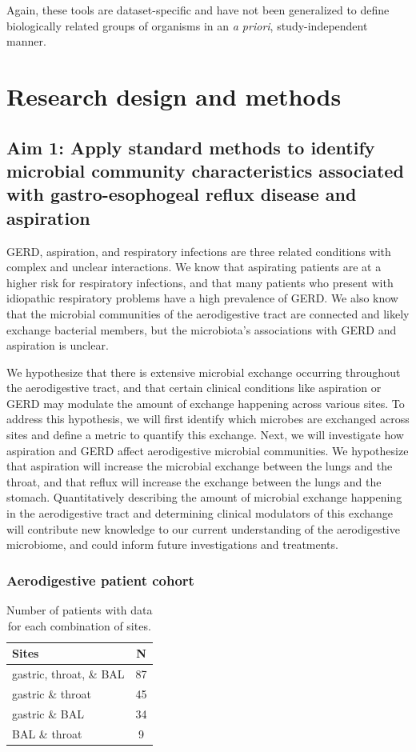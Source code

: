 \documentclass[12pt]{article}
\begin{document}
Again, 
these tools are dataset-specific and have not been generalized to 
define biologically related groups of organisms in an \textit{a priori}, study-independent manner.

\section{Research design and methods}

\subsection{Aim 1: Apply standard methods to identify microbial community characteristics associated with gastro-esophogeal reflux disease and aspiration}

GERD, aspiration, and respiratory infections are three related
conditions with complex and unclear interactions.
We know that aspirating patients are at a higher risk for respiratory
infections, and that many patients who present with idiopathic
respiratory problems have a high prevalence of GERD. 
We also know that the microbial communities of the aerodigestive tract
are connected and likely exchange bacterial members, but the microbiota's
associations with GERD and aspiration is unclear.

We hypothesize that there is extensive microbial exchange occurring
throughout the aerodigestive tract, and that certain clinical conditions like aspiration
or GERD may modulate the amount of exchange happening across various sites. 
To address this hypothesis, we will first identify which microbes
are exchanged across sites and define a metric to quantify this exchange. 
Next, we will investigate how aspiration and GERD affect aerodigestive microbial communities. 
We hypothesize that aspiration will increase the microbial exchange between the lungs and the throat,
and that reflux will increase the exchange between the lungs and the stomach.
Quantitatively describing the amount of microbial exchange happening in the
aerodigestive tract and determining clinical modulators of this exchange
will contribute new knowledge to our current understanding of the
aerodigestive microbiome, and could inform future investigations and treatments.

\subsubsection{Aerodigestive patient cohort}

\begin{table}
\begin{tabular}{l c}
	\hline
	\textbf{Sites} & \textbf{N} \\
	\hline
	gastric, throat, \& BAL & 87 \\
	gastric \& throat & 45 \\
	gastric \& BAL & 34 \\
	BAL \& throat & 9 \\
	\hline 
\end{tabular}
\caption{Number of patients with data for each combination of sites.}\label{tab:rosen_samples}
\end{table}
\end{document}
